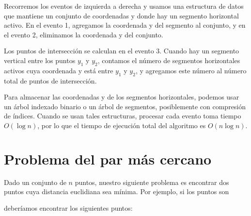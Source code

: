 Recorremos los eventos de izquierda a derecha
y usamos una estructura de datos que mantiene un conjunto de
coordenadas y donde hay un segmento horizontal activo.
En el evento 1, agregamos la coordenada y del segmento
al conjunto, y en el evento 2, eliminamos la
coordenada y del conjunto.

Los puntos de intersección se calculan en el evento 3.
Cuando hay un segmento vertical entre los puntos
$y_1$ y $y_2$, contamos el número de segmentos
horizontales activos cuya coordenada y está entre
$y_1$ y $y_2$, y agregamos este número al número
total de puntos de intersección.

Para almacenar las coordenadas y de los segmentos horizontales,
podemos usar un árbol indexado binario o un árbol de segmentos,
posiblemente con compresión de índices.
Cuando se usan tales estructuras, procesar cada evento
toma tiempo $O(\log n)$, por lo que el tiempo de ejecución
total del algoritmo es $O(n \log n)$.

\section{Problema del par más cercano}


Dado un conjunto de $n$ puntos, nuestro siguiente problema es
encontrar dos puntos cuya distancia euclidiana sea mínima.
Por ejemplo, si los puntos son
\begin{center}
\end{center}
\begin{samepage}
deberíamos encontrar los siguientes puntos:
\begin{center}
\end{center}
\end{samepage}

